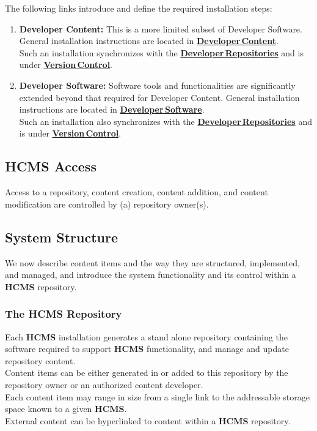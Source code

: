 \documentclass[12pt]{article}
\begin{document}
The following links introduce and define the required installation steps:
\begin{enumerate}
\item {\bf Developer Content:} This is a more limited subset of Developer Software. General installation instructions are located in \href{../heterarch-developer-content/heterarch-developer-content.tex}{\bf Developer\,Content}.\\
Such an installation synchronizes with the \href{../developer-repository/developer-repository.tex}{\bf Developer\,Repositories} and is under \href{../version-control/version-control.tex}{\bf Version\,Control}.
\item {\bf Developer Software:} Software tools and functionalities are significantly extended beyond that required for Developer Content. General installation instructions are located in \href{../heterarch-developer-software.tex}{\bf Developer\,Software}.\\ Such an installation also synchronizes with the \href{../developer-repository/developer-repository.tex}{\bf Developer\,Repositories} and is under \href{../version-control/version-control.tex}{\bf Version\,Control}.\\
\end{enumerate}

\subsection*{HCMS Access}

Access to a repository, content creation, content addition, and content modification are controlled by (a) repository owner(s).

\subsection*{System Structure}

We now describe content items and the way they are structured, implemented, and managed, and introduce the system functionality and its control within a {\bf \small HCMS} repository.

\subsubsection*{The HCMS Repository}

Each {\bf \small HCMS} installation generates a stand alone repository containing the software required to support {\bf \small HCMS} functionality, and manage and update repository content.\\
Content items can be either generated in or added to this repository by the repository owner or an authorized content developer.\\
Each content item may range in size from a single link to the addressable storage space known to a given {\bf \small HCMS}.\\
External content can be hyperlinked to content within a {\bf \small HCMS} repository.
\end{document}
